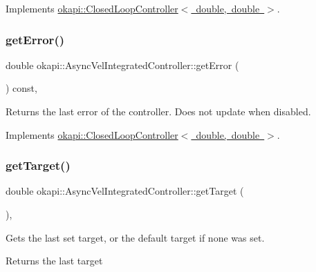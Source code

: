 Implements \mbox{\hyperlink{classokapi_1_1ClosedLoopController_a768cd1db40ce9cd5c89b20be6e838ccc}{okapi\+::\+Closed\+Loop\+Controller$<$ double, double $>$}}.

\mbox{\label{classokapi_1_1AsyncVelIntegratedController_a6641352cebd3f0baa4e3e1ab4ad27be3}} 
\subsubsection{\texorpdfstring{getError()}{getError()}}
{\footnotesize\ttfamily double okapi\+::\+Async\+Vel\+Integrated\+Controller\+::get\+Error (\begin{DoxyParamCaption}{ }\end{DoxyParamCaption}) const\hspace{0.3cm}{\ttfamily [override]}, {\ttfamily [virtual]}}

Returns the last error of the controller. Does not update when disabled. 

Implements \mbox{\hyperlink{classokapi_1_1ClosedLoopController_a50c73444ff6e3e631951c43d0f951953}{okapi\+::\+Closed\+Loop\+Controller$<$ double, double $>$}}.

\mbox{\label{classokapi_1_1AsyncVelIntegratedController_a030ca47508587f799dfdd7d97ed86d7d}} 
\subsubsection{\texorpdfstring{getTarget()}{getTarget()}}
{\footnotesize\ttfamily double okapi\+::\+Async\+Vel\+Integrated\+Controller\+::get\+Target (\begin{DoxyParamCaption}{ }\end{DoxyParamCaption})\hspace{0.3cm}{\ttfamily [override]}, {\ttfamily [virtual]}}

Gets the last set target, or the default target if none was set.

\begin{DoxyReturn}{Returns}
the last target 
\end{DoxyReturn}


